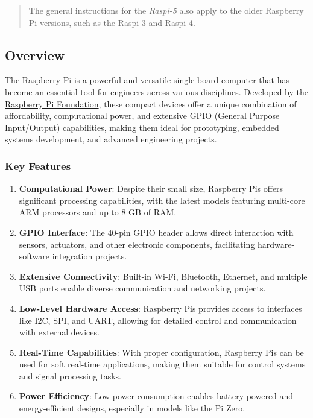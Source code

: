 \documentclass[
]{article}
\begin{document}
\begin{quote}
The general instructions for the \emph{Raspi-5} also apply to the older
Raspberry Pi versions, such as the Raspi-3 and Raspi-4.
\end{quote}

\subsection{Overview}\label{sec-setup-overview-737b}

The Raspberry Pi is a powerful and versatile single-board computer that
has become an essential tool for engineers across various disciplines.
Developed by the \href{https://www.raspberrypi.org/}{Raspberry Pi
Foundation}, these compact devices offer a unique combination of
affordability, computational power, and extensive GPIO (General Purpose
Input/Output) capabilities, making them ideal for prototyping, embedded
systems development, and advanced engineering projects.

\subsubsection{Key Features}\label{sec-setup-key-features-2bff}

\begin{enumerate}
\def\labelenumi{\arabic{enumi}.}
\item
  \textbf{Computational Power}: Despite their small size, Raspberry Pis
  offers significant processing capabilities, with the latest models
  featuring multi-core ARM processors and up to 8 GB of RAM.
\item
  \textbf{GPIO Interface}: The 40-pin GPIO header allows direct
  interaction with sensors, actuators, and other electronic components,
  facilitating hardware-software integration projects.
\item
  \textbf{Extensive Connectivity}: Built-in Wi-Fi, Bluetooth, Ethernet,
  and multiple USB ports enable diverse communication and networking
  projects.
\item
  \textbf{Low-Level Hardware Access}: Raspberry Pis provides access to
  interfaces like I2C, SPI, and UART, allowing for detailed control and
  communication with external devices.
\item
  \textbf{Real-Time Capabilities}: With proper configuration, Raspberry
  Pis can be used for soft real-time applications, making them suitable
  for control systems and signal processing tasks.
\item
  \textbf{Power Efficiency}: Low power consumption enables
  battery-powered and energy-efficient designs, especially in models
  like the Pi Zero.
\end{enumerate}
\end{document}
